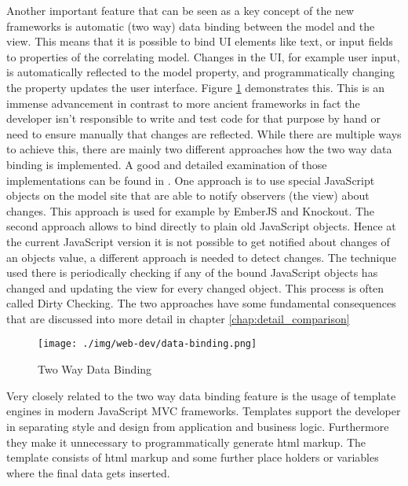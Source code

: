 Another important feature that can be seen as a key concept of the new frameworks is automatic (two way) data binding between the model and the view.
This means that it is possible to bind UI elements like text, or input fields to properties of the correlating model.
Changes in the UI, for example user input, is automatically reflected to the model property, and programmatically changing the property updates the user interface. Figure \ref{fig:data-binding} demonstrates this.
This is an immense advancement in contrast to more ancient frameworks in fact the developer isn't  responsible to write and test code for that purpose by hand or need to ensure manually that changes are reflected.
While there are multiple ways to achieve this, there are mainly two different approaches how the two way data binding is implemented.
A good and detailed examination of those implementations can be found in \autocite[]{binding_comparison}.
One approach is to use special JavaScript objects on the model site that are able to notify observers (the view) about changes.
This approach is used for example by EmberJS and Knockout.
The second approach allows to bind directly to plain old JavaScript objects.
Hence at the current JavaScript version it is not possible to get notified about changes of an objects value, a different approach is needed to detect changes.
The technique used there is periodically checking if any of the bound JavaScript objects has changed and updating the view for every changed object.
This process is often called Dirty Checking.
The two approaches have some fundamental consequences that are discussed into more detail in chapter \ref{chap:detail_comparison}

\begin{figure}
	\centering \texttt{[image: ./img/web-dev/data-binding.png]}
	\caption{Two Way Data Binding \autocite{ng-binding}}
	\label{fig:data-binding}
\end{figure}

Very closely related to the two way data binding feature is the usage of template engines in modern JavaScript MVC frameworks.
Templates support the developer in separating style and design from application and business logic.
Furthermore they make it unnecessary to programmatically generate html markup.
The template consists of html markup and some further place holders or variables where the final data gets inserted.

